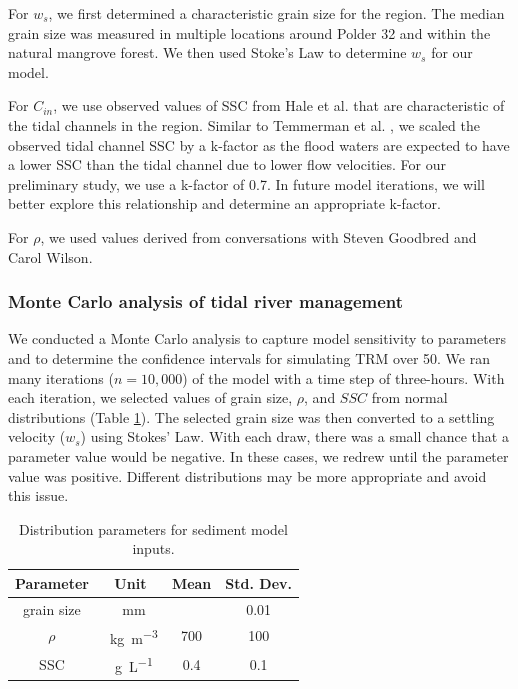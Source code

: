 \documentclass[12pt]{article}
\begin{document}
For $w_s$, we first determined a characteristic grain size for the region. The median grain size was measured in multiple locations around Polder 32 and within the natural mangrove forest. We then used Stoke's Law to determine $w_s$ for our model.

For $C_{in}$, we use observed values of SSC from Hale et al. \cite{haleObservationsScalingTidal2019} that are characteristic of the tidal channels in the region. Similar to Temmerman et al. \cite{temmermanModellingLongtermTidal2003,temmermanModellingEstuarineVariations2004}, we scaled the observed tidal channel SSC by a k-factor as the flood waters are expected to have a lower SSC than the tidal channel due to lower flow velocities. For our preliminary study, we use a k-factor of 0.7. In future model iterations, we will better explore this relationship and determine an appropriate k-factor.

For $\rho$, we used values derived from conversations with Steven Goodbred and Carol Wilson.

\subsubsection*{Monte Carlo analysis of tidal river management}

We conducted a Monte Carlo analysis to capture model sensitivity to parameters and to determine the confidence intervals for simulating TRM over \SI{50}{\year}. We ran many iterations ($n = 10,000$) of the model with a time step of three-hours. With each iteration, we selected values of grain size, $\rho$, and $SSC$ from normal distributions (Table \ref{fig:tbl1}). The selected grain size was then converted to a settling velocity ($w_s$) using Stokes' Law. With each draw, there was a small chance that a parameter value would be negative. In these cases, we redrew until the parameter value was positive. Different distributions may be more appropriate and avoid this issue.

\begin{table}[H]
	\centering
	\caption[Distribution parameters for sediment model inputs]{\label{fig:tbl1} Distribution parameters for sediment model inputs.}
	\begin{tabular}{cccc}
		\hline
		Parameter  & Unit                              & Mean      & Std. Dev. \\ \hline
		grain size & \SI{}{\milli\meter}               & \SI{0.03} & 0.01      \\
		$\rho$     & \SI{}{\kilo\gram\per\cubic\meter} & 700       & 100       \\
		SSC        & \SI{}{\gram\per\liter}            & 0.4       & 0.1       \\ \hline
	\end{tabular}
\end{table}
\end{document}
